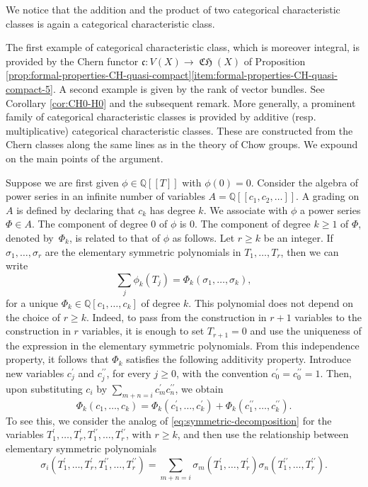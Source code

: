 \documentclass[11pt]{article}
\newcommand{\resp}{resp.\xspace}
\newcommand{\llbracket}{[\![}
\newcommand{\rrbracket}{]\!]}
\theoremstyle{plain}
\theoremstyle{definition}
\newcommand{\QBbb}{\mathbb Q}
\newcommand{\cfrak}{\mathfrak c}
\DeclareMathOperator{\CHfrak}{\mathfrak{CH}}
\begin{document}
We notice that the addition and the product of two categorical characteristic classes is again a categorical characteristic class.

The first example of categorical characteristic class, which is moreover integral, is provided by the Chern functor $\cfrak\colon V(X)\to\CHfrak(X)$ of Proposition \ref{prop:formal-properties-CH-quasi-compact}\eqref{item:formal-properties-CH-quasi-compact-5}. A second example is given by the rank of vector bundles. See Corollary \ref{cor:CH0-H0} and the subsequent remark. More generally, a prominent family of categorical characteristic classes is provided by additive (\resp multiplicative) categorical characteristic classes. These are constructed from the Chern classes along the same lines as in the theory of Chow groups. We expound on the main points of the argument.

Suppose we are first given $\phi\in\QBbb\llbracket T\rrbracket$ with $\phi(0)=0$. Consider the algebra of power series in an infinite number of variables $A=\QBbb\llbracket c_{1},c_{2},\ldots\rrbracket$. A grading on $A$ is defined by declaring that $c_{k}$ has degree $k$. We associate with $\phi$ a power series $\Phi\in A$. The component of degree 0 of $\phi$ is 0. The component of degree $k\geq 1$ of $\Phi$, denoted by~$\Phi_{k}$, is related to that of $\phi$ as follows. Let $r\geq k$ be an integer. If $\sigma_{1},\ldots,\sigma_{r}$ are the elementary symmetric polynomials in $T_{1},\ldots, T_{r}$, then we can write
\begin{equation}\label{eq:symmetric-decomposition}
\sum_{j}\phi_{k}(T_{j})=\Phi_{k}(\sigma_{1},\ldots,\sigma_{k}),
\end{equation}
for a unique $\Phi_{k}\in\QBbb[c_{1},\ldots, c_{k}]$ of degree $k$. This polynomial does not depend on the choice of $r\geq k$. Indeed, to pass from the construction in $r+1$ variables to the construction in $r$ variables, it is enough to set $T_{r+1}=0$ and use the uniqueness of the expression in the elementary symmetric polynomials. From this independence property, it follows that $\Phi_{k}$ satisfies the following additivity property. Introduce new variables $c_{j}^{\prime}$ and $c_{j}^{\prime\prime}$, for every $j\geq 0$, with the convention $c_{0}^{\prime}=c_{0}^{\prime\prime}=1$. Then, upon substituting $c_{i}$ by $\sum_{m+n=i}c_{m}^{\prime}c_{n}^{\prime\prime}$, we obtain
\begin{equation}\label{eq:phi-additive-property}
\Phi_{k}(c_{1},\ldots,c_{k})=\Phi_{k}(c_{1}^{\prime},\ldots,c_{k}^{\prime})+\Phi_{k}(c_{1}^{\prime\prime},\ldots,c_{k}^{\prime\prime}).
\end{equation}
To see this, we consider the analog of \eqref{eq:symmetric-decomposition} for the variables $T_{1}^{\prime},\ldots,T_{r}^{\prime},T_{1}^{\prime\prime},\ldots, T_{r}^{\prime\prime}$, with $r\geq k$, and then use the relationship between elementary symmetric polynomials
\begin{displaymath}
\sigma_{i}(T_{1}^{\prime},\ldots,T_{r}^{\prime},T_{1}^{\prime\prime},\ldots, T_{r}^{\prime\prime})
=\sum_{m+n=i}\sigma_{m}(T_{1}^{\prime},\ldots,T_{r}^{\prime})\sigma_{n}(T_{1}^{\prime\prime},\ldots,T_{r}^{\prime\prime}).
\end{displaymath}
\end{document}
